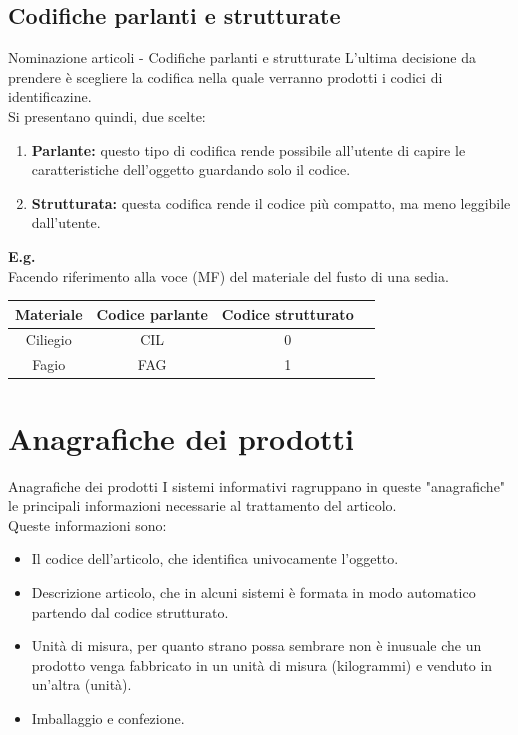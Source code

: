 \documentclass{beamer}
\begin{document}
\subsection{Codifiche parlanti e strutturate}
\begin{frame}{Nominazione articoli - Codifiche parlanti e strutturate}
    L'ultima decisione da prendere è scegliere la codifica nella quale verranno prodotti i codici di identificazine.\\
    Si presentano quindi, due scelte:
    \begin{enumerate}
        \item \textbf{Parlante:} questo tipo di codifica rende possibile all'utente di capire le caratteristiche dell'oggetto guardando solo il codice.
        \item \textbf{Strutturata:} questa codifica rende il codice più compatto, ma meno leggibile dall'utente.
    \end{enumerate}
    \textbf{E.g.}\\
    Facendo riferimento alla voce (MF) del materiale del fusto di una sedia.
    \begin{center}
        \begin{tabular}{|c|c|c|c|}
            \hline
            \textbf{Materiale} & \textbf{Codice parlante} & \textbf{Codice strutturato} \\
            \hline
            Ciliegio           & CIL                      & 0                           \\
            \hline
            Fagio              & FAG                      & 1                           \\
            \hline
        \end{tabular}
    \end{center}
\end{frame}

\section{Anagrafiche dei prodotti}
\begin{frame}{Anagrafiche dei prodotti}
    I sistemi informativi ragruppano in queste "anagrafiche" le principali informazioni necessarie al trattamento del articolo.\\
    Queste informazioni sono:
    \begin{itemize}
        \item Il codice dell'articolo, che identifica univocamente l'oggetto.
        \item Descrizione articolo, che in alcuni sistemi è formata in modo automatico partendo dal codice strutturato.
        \item Unità di misura, per quanto strano possa sembrare non è inusuale che un prodotto venga fabbricato in un unità di misura (kilogrammi) e venduto in un'altra (unità).
        \item Imballaggio e confezione.
    \end{itemize}
\end{frame}
\end{document}
